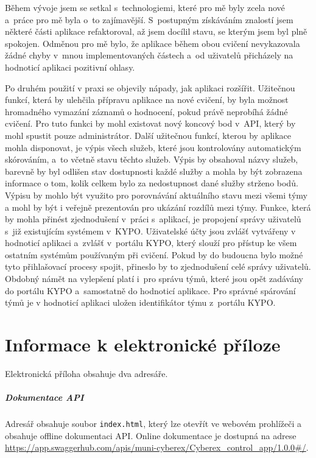\documentclass[
  digital,
  twoside,
  table, 
  nolof, 
  nolot
]{fithesis3}
\begin{document}
Během vývoje jsem se setkal s~technologiemi, které pro mě byly zcela nové a~práce pro mě byla o~to zajímavější. S~postupným získáváním znalostí jsem některé části aplikace refaktoroval, až jsem docílil stavu, se kterým jsem byl plně spokojen. Odměnou pro mě bylo, že aplikace během obou cvičení nevykazovala žádné chyby v~mnou implementovaných částech a~od uživatelů přicházely na hodnoticí aplikaci pozitivní ohlasy.

Po druhém použití v praxi se objevily nápady, jak aplikaci rozšířit. Užitečnou funkcí, která by ulehčila přípravu aplikace na nové cvičení, by byla možnost hromadného vymazání záznamů o hodnocení, pokud právě neprobíhá žádné cvičení. Pro tuto funkci by mohl existovat nový koncový bod v~API, který by mohl spustit pouze administrátor. Další užitečnou funkcí, kterou by aplikace mohla disponovat, je výpis všech služeb, které jsou kontrolovány automatickým skórováním, a~to včetně stavu těchto služeb. Výpis by obsahoval názvy služeb, barevně by byl odlišen stav dostupnosti každé služby a mohla by být zobrazena informace o tom, kolik celkem bylo za nedostupnost dané služby strženo bodů.
Výpisu by mohlo být využito pro porovnávání aktuálního stavu mezi všemi týmy a mohl by být i veřejně prezentován pro ukázání rozdílů mezi týmy. Funkce, která by mohla přinést zjednodušení v~práci s~aplikací, je propojení správy uživatelů s~již existujícím systémem v~KYPO. Uživatelské účty jsou zvlášť vytvářeny v hodnoticí aplikaci a~zvlášť v~portálu KYPO, který slouží pro přístup ke všem ostatním systémům používaným při cvičení. Pokud by do budoucna bylo možné tyto přihlašovací procesy spojit, přineslo by to zjednodušení celé správy uživatelů. Obdobný námět na vylepšení platí i~pro správu týmů, které jsou opět zadávány do portálu KYPO a~samostatně do hodnoticí aplikace. Pro správné spárování týmů je v hodnoticí aplikaci uložen identifikátor týmu z~portálu KYPO.

\printbibliography[heading=bibintoc] %

\appendix %
\chapter{Informace k elektronické příloze}

Elektronická příloha obsahuje dva adresáře.

\paragraph{Dokumentace API} Adresář obsahuje soubor \texttt{index.html}, který lze otevřít ve webovém prohlížeči a obsahuje offline dokumentaci API. Online dokumentace je dostupná na adrese \url{https://app.swaggerhub.com/apis/muni-cyberex/Cyberex_control_app/1.0.0#/}.
    
\end{document}
